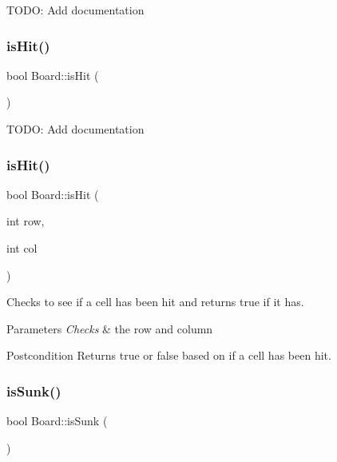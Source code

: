 T\+O\+DO\+: Add documentation \mbox{\label{classBoard_a785d6203e06e8d588c88574c34feff7c}} 
\subsubsection{\texorpdfstring{isHit()}{isHit()}\hspace{0.1cm}{\footnotesize\ttfamily [1/2]}}
{\footnotesize\ttfamily bool Board\+::is\+Hit (\begin{DoxyParamCaption}{ }\end{DoxyParamCaption})}

T\+O\+DO\+: Add documentation \mbox{\label{classBoard_a6ac4c446c46824635b189b850f8cfa0a}} 
\subsubsection{\texorpdfstring{isHit()}{isHit()}\hspace{0.1cm}{\footnotesize\ttfamily [2/2]}}
{\footnotesize\ttfamily bool Board\+::is\+Hit (\begin{DoxyParamCaption}\item[{int}]{row,  }\item[{int}]{col }\end{DoxyParamCaption})}



Checks to see if a cell has been hit and returns true if it has. 


\begin{DoxyParams}{Parameters}
{\em Checks} & the row and column \\
\hline
\end{DoxyParams}
\begin{DoxyPostcond}{Postcondition}
Returns true or false based on if a cell has been hit. 
\end{DoxyPostcond}
\mbox{\label{classBoard_a242488b02ce0a370c7648df567aa7ec0}} 
\subsubsection{\texorpdfstring{isSunk()}{isSunk()}\hspace{0.1cm}{\footnotesize\ttfamily [1/2]}}
{\footnotesize\ttfamily bool Board\+::is\+Sunk (\begin{DoxyParamCaption}{ }\end{DoxyParamCaption})}

